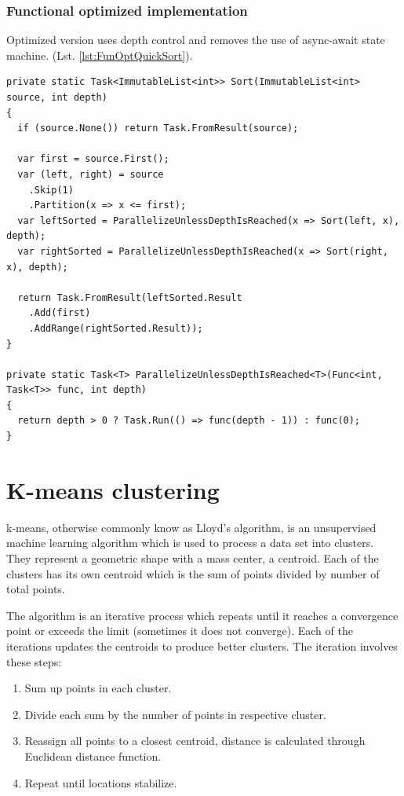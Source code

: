 \subsubsection{Functional optimized implementation}
Optimized version uses depth control and removes the use of async-await state machine.
(Lst. \ref{lst:FunOptQuickSort}).
\begin{lstlisting}[language={[sharp]c}, style=sharpcstyle, caption={Functional optimized quicksort}, label={lst:FunOptQuickSort}]
private static Task<ImmutableList<int>> Sort(ImmutableList<int> source, int depth)
{
  if (source.None()) return Task.FromResult(source);

  var first = source.First();
  var (left, right) = source
    .Skip(1)
    .Partition(x => x <= first);
  var leftSorted = ParallelizeUnlessDepthIsReached(x => Sort(left, x), depth);
  var rightSorted = ParallelizeUnlessDepthIsReached(x => Sort(right, x), depth);

  return Task.FromResult(leftSorted.Result
    .Add(first)
    .AddRange(rightSorted.Result));
}

private static Task<T> ParallelizeUnlessDepthIsReached<T>(Func<int, Task<T>> func, int depth)
{
  return depth > 0 ? Task.Run(() => func(depth - 1)) : func(0);
}
\end{lstlisting}



\clearpage
\section{K-means clustering}
k-means, otherwise commonly know as Lloyd's algorithm, is an unsupervised machine learning algorithm which is used to process a data set into clusters.
They represent a geometric shape with a mass center, a centroid.
Each of the clusters has its own centroid which is the sum of points divided by number of total points. 

The algorithm is an iterative process which repeats until it reaches a convergence point or exceeds the limit (sometimes it does not converge).
Each of the iterations updates the centroids to produce better clusters.
The iteration involves these steps:
\begin{enumerate}
	\item Sum up points in each cluster.
	\item Divide each sum by the number of points in respective cluster.
	\item Reassign all points to a closest centroid, distance is calculated through Euclidean distance function.
	\item Repeat until locations stabilize.
\end{enumerate}

